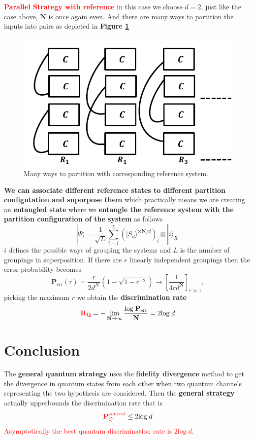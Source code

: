 \documentclass[a4paper,11pt]{article}
\begin{document}
\textbf{\textcolor{red}{Parallel Strategy with reference}} in this case we choose $d=2$, just like the case above, $\mathbf{N}$ is once again even. And there are many ways to partition the inputs into pairs as depicted in \textbf{Figure \ref{circ:partition}}
\begin{figure}
	\centering
	\includegraphics[width=0.6\linewidth]{pics/equivalent-strategy}
	\caption{Many ways to partition with corresponding reference system.}
	\label{circ:partition}
\end{figure}
\textbf{We can associate different reference states to different partition configutation and suporpose them} which practically means we are creating an \textbf{entangled state} where we \textbf{entangle the reference system with the partition configuration of the system} as follows
\begin{equation}
	|\Psi\rangle = \frac{1}{\sqrt{L}}\sum_{i=1}^{L}\left(|S_d\rangle^{\otimes \mathbf{N}/d}\right)_i\otimes|i\rangle_R.
\end{equation}
$i$ defines the possible ways of grouping the systems and $L$ is the number of groupings in superposition. If there are $r$ linearly independent groupings then the error probability becomes
\begin{equation}
	\mathbf{P}_\text{err}(r) = \frac{r}{2d^\mathcal{N}}\left(1-\sqrt{1-r^{-2}}\right)\rightarrow\left[\frac{1}{4rd^\mathbf{N}}\right]_{r\gg1},
\end{equation}
picking the maximum $r$ we obtain the \textbf{discrimination rate}
\begin{equation}
	\mathbf{\textcolor{red}{R_Q}} = -\lim_{\mathbf{N}\rightarrow\infty}\frac{\text{log}\;\mathbf{P}_\text{err}}{\mathbf{N}}=2\text{log}\;d
\end{equation}

\section{Conclusion}
The \textbf{general quantum strategy} uses the \textbf{fidelity divergence} method to get the divergence in quantum states from each other when two quantum channels representing the two hypothesis are considered. Then the \textbf{general strategy} actually upperbounds the discrimination rate that is
\begin{equation}
	\textcolor{red}{\mathbf{P}^\text{general}_{Q}} \leq 2\text{log}\;d
\end{equation} 
\textcolor{red}{Asymptotically the best quantum discrimination rate is $2\text{log}\; d$}.
\end{document}
